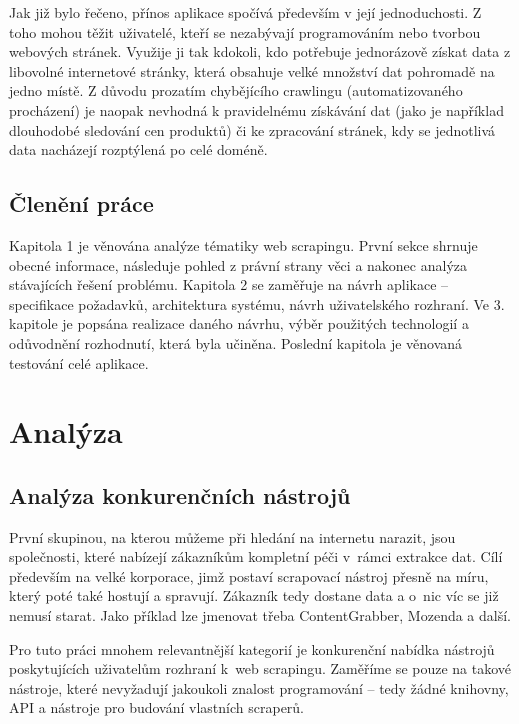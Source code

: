 \documentclass[thesis=B,czech]{FITthesis2}[2012/06/26]
\begin{document}
\begin{introduction}
		Jak již bylo řečeno, přínos aplikace spočívá především v její jednoduchosti. Z toho mohou těžit uživatelé, kteří se nezabývají programováním nebo tvorbou webových stránek. Využije ji tak kdokoli, kdo potřebuje jednorázově získat data z libovolné internetové stránky, která obsahuje velké množství dat pohromadě na jedno místě. Z důvodu prozatím chybějícího crawlingu (automatizovaného procházení) je naopak nevhodná k pravidelnému získávání dat (jako je například dlouhodobé sledování cen produktů) či ke zpracování stránek, kdy se jednotlivá data nacházejí rozptýlená po celé doméně.
		
		\section*{Členění práce}
		Kapitola 1 je věnována analýze tématiky web scrapingu. První sekce shrnuje obecné informace, následuje pohled z právní strany věci a nakonec analýza stávajících řešení problému. Kapitola 2 se zaměřuje na návrh aplikace -- specifikace požadavků, architektura systému, návrh uživatelského rozhraní. Ve 3. kapitole je popsána realizace daného návrhu, výběr použitých technologií a odůvodnění rozhodnutí, která byla učiněna. Poslední kapitola je věnovaná testování celé aplikace.
	\end{introduction}
	
	
	
	
	\chapter{Analýza}
	
	\section{Analýza konkurenčních nástrojů}
	První skupinou, na kterou můžeme při hledání na internetu narazit, jsou společnosti, které nabízejí zákazníkům kompletní péči v~rámci extrakce dat. Cílí především na velké korporace, jimž postaví scrapovací nástroj přesně na míru, který poté také hostují a spravují. Zákazník tedy dostane data a o~nic víc se již nemusí starat. Jako příklad lze jmenovat třeba ContentGrabber, Mozenda a další.
	
	Pro tuto práci mnohem relevantnější kategorií je konkurenční nabídka nástrojů poskytujících uživatelům rozhraní k~web scrapingu. Zaměříme se pouze na takové nástroje, které nevyžadují jakoukoli znalost programování -- tedy žádné knihovny, API a nástroje pro budování vlastních scraperů.
	
\end{document}
